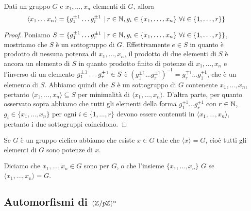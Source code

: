 \documentclass[11pt]{scrartcl}
\begin{document}
\begin{proposition}
Dati un gruppo $G$ e $x_1, \ldots, x_n$ elementi di $G$, allora \[
    \langle x_1 \ldots x_n\rangle = \{g_1^{\pm 1} \ldots g_r^{\pm 1}\mid r 
    \in \mathbb N, g_i \in \{x_1, \ldots, x_n\}~\forall i \in \{1, \ldots, r\}\}
    \]
\end{proposition}

\begin{proof}
Poniamo $S = \{g_1^{\pm 1} \ldots g_r^{\pm 1}\mid r \in \mathbb N, g_i \in \{x_1, \ldots, x_n\}
~\forall i \in \{1, \ldots, r\}\}$, mostriamo che $S$ è un sottogruppo di $G$. 
Effettivamente $e \in S$ in quanto è prodotto di nessuna potenza di $x_1, \ldots, x_n$, 
il prodotto di due elementi di $S$ è ancora un elemento di $S$ in quanto
prodotto finito di potenze di $x_1, \ldots, x_n$ e l'inverso di un elemento
$g_1^{\pm 1}\ldots g_r^{\pm 1} \in\nolinebreak S$ è $(g_1^{\pm 1}\ldots 
g_r^{\pm 1})^{-1} = g_r^{\mp 1}\ldots g_1^{\mp 1}$, che è un elemento di $S$.
Abbiamo quindi che $S$ è un sottogruppo di $G$ contenente $x_1, \ldots, x_n$,
pertanto $\langle x_1, \ldots, x_n\rangle\subseteq S$ per minimalità di $\langle x_1,
\ldots, x_n\rangle$. D'altra parte, per quanto osservato sopra abbiamo che
tutti gli elementi della forma $g_1^{\pm 1}\ldots g_r^{\pm 1}$ con $r \in \mathbb N$, 
$g_i \in \{x_1, \ldots, x_n\}$ per ogni $i \in \{1, \ldots, r\}$ devono essere
contenuti in $\langle x_1, \ldots, x_n\rangle$, pertanto i due sottogruppi
coincidono.
\end{proof}

\begin{remark}
    Se $G$ è un gruppo ciclico abbiamo che esiste $x \in G$ tale che 
    $\langle x\rangle = G$, cioè tutti gli elementi di $G$ sono potenze di $x$.
\end{remark}

Diciamo che $x_1, \ldots, x_n \in G$ sono  per $G$, o che 
l'insieme $\{x_1, \ldots, x_n\}$  $G$ se $\langle x_1, \ldots, x_n\rangle = G$.

\newpage

\subsection{Automorfismi di $({\mathbb Z}/p{\mathbb Z})^n$}
\label{aut sp vet}
\end{document}
